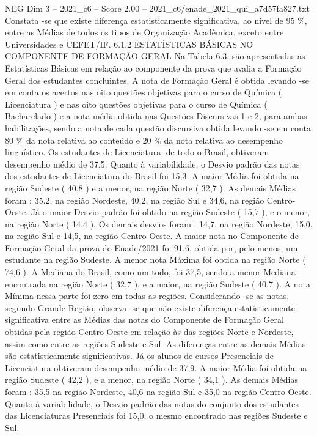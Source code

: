 \begin{textsample}{NEG Dim 3 – 2021\_c6 – Score 2.00 – 2021\_c6/enade\_2021\_qui\_a7d57fa827.txt}
Constata -se que existe diferença estatisticamente significativa, ao nível de 95 \%, entre as Médias de todos os tipos de Organização Acadêmica, exceto entre Universidades e CEFET/IF. 6.1.2 ESTATÍSTICAS BÁSICAS NO COMPONENTE DE FORMAÇÃO GERAL Na Tabela 6.3, são apresentadas as Estatísticas Básicas em relação ao componente da prova que avalia a Formação Geral dos estudantes concluintes.
A nota de Formação Geral é obtida levando -se em conta os acertos nas oito questões objetivas para o curso de Química ( Licenciatura ) e nas oito questões objetivas para o curso de Química ( Bacharelado ) e a nota média obtida nas Questões Discursivas 1 e 2, para ambas habilitações, sendo a nota de cada questão discursiva obtida levando -se em conta 80 \% da nota relativa ao conteúdo e 20 \% da nota relativa ao desempenho linguístico.
Os estudantes de Licenciatura, de todo o Brasil, obtiveram desempenho médio de 37,5.
Quanto à variabilidade, o Desvio padrão das notas dos estudantes de Licenciatura do Brasil foi 15,3.
A maior Média foi obtida na região Sudeste ( 40,8 ) e a menor, na região Norte ( 32,7 ).
As demais Médias foram : 35,2, na região Nordeste, 40,2, na região Sul e 34,6, na região Centro-Oeste.
Já o maior Desvio padrão foi obtido na região Sudeste ( 15,7 ), e o menor, na região Norte ( 14,4 ).
Os demais desvios foram : 14,7, na região Nordeste, 15,0, na região Sul e 14,5, na região Centro-Oeste.
A maior nota no Componente de Formação Geral da prova do Enade/2021 foi 91,6, obtida por, pelo menos, um estudante na região Sudeste.
A menor nota Máxima foi obtida na região Norte ( 74,6 ).
A Mediana do Brasil, como um todo, foi 37,5, sendo a menor Mediana encontrada na região Norte ( 32,7 ), e a maior, na região Sudeste ( 40,7 ).
A nota Mínima nessa parte foi zero em todas as regiões.
Considerando -se as notas, segundo Grande Região, observa -se que não existe diferença estatisticamente significativa entre as Médias das notas do Componente de Formação Geral obtidas pela região Centro-Oeste em relação às das regiões Norte e Nordeste, assim como entre as regiões Sudeste e Sul.
As diferenças entre as demais Médias são estatisticamente significativas.
Já os alunos de cursos Presenciais de Licenciatura obtiveram desempenho médio de 37,9.
A maior Média foi obtida na região Sudeste ( 42,2 ), e a menor, na região Norte ( 34,1 ).
As demais Médias foram : 35,5 na região Nordeste, 40,6 na região Sul e 35,0 na região Centro-Oeste.
Quanto à variabilidade, o Desvio padrão das notas do conjunto dos estudantes das Licenciaturas Presenciais foi 15,0, o mesmo encontrado nas regiões Sudeste e Sul.

\end{textsample}

